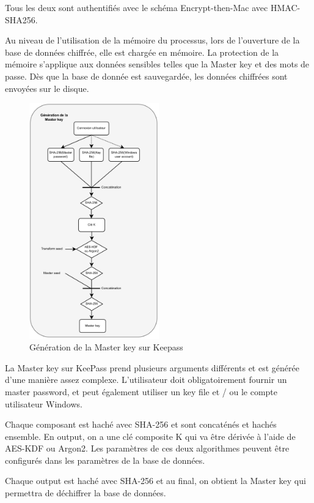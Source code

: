 Tous les deux sont authentifiés avec le schéma Encrypt-then-Mac avec HMAC-SHA256. 

Au niveau de l'utilisation de la mémoire du processus, lors de l'ouverture de la base de données chiffrée, elle est chargée en mémoire. La protection de la mémoire s'applique aux données sensibles telles que la Master key et des mots de passe. Dès que la base de donnée est sauvegardée, les données chiffrées sont envoyées sur le disque.

 \newpage

\begin{figure} 
	\includegraphics[width=0.5\textwidth]{images/keepass_generation_key.png}
	\caption{Génération de la Master key sur Keepass \label{schema_keepass}}
\end{figure}

La Master key sur KeePass prend plusieurs arguments différents et est générée d'une manière assez complexe. L'utilisateur doit obligatoirement fournir un master password, et peut également utiliser un key file et / ou le compte utilisateur Windows. 

Chaque composant est haché avec SHA-256 et sont concaténés et hachés ensemble. En output, on a une clé composite K qui va être dérivée à l'aide de AES-KDF ou Argon2. Les paramètres de ces deux algorithmes peuvent être configurés dans les paramètres de la base de données.

Chaque output est haché avec SHA-256 et au final, on obtient la Master key qui permettra de déchiffrer la base de données.

